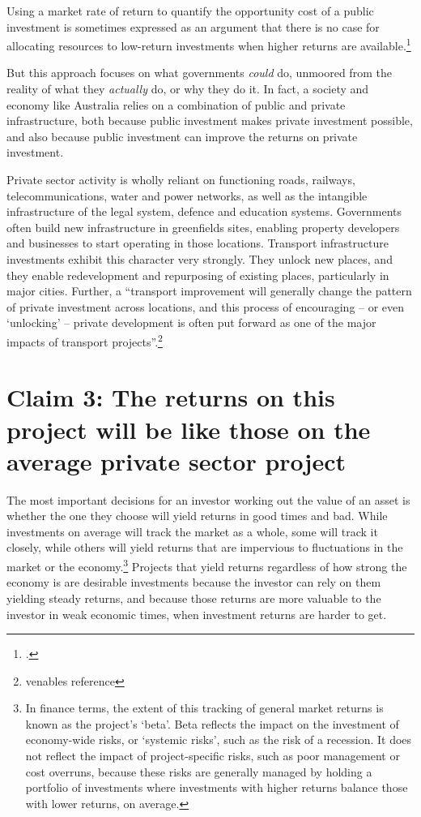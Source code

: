 Using a market rate of return to quantify the opportunity cost of a public investment is sometimes expressed as an argument that there is no case for allocating resources to low-return investments when higher returns are available.\footcite[][viii]{Harrison-Valuing-the-Future} 

But this approach focuses on what governments \emph{could} do, unmoored from the reality of what they \emph{actually} do, or why they do it. In fact, a society and economy like Australia relies on a combination of public and private infrastructure, both because public investment makes private investment possible, and also because public investment can improve the returns on private investment.

Private sector activity is wholly reliant on functioning roads, railways, telecommunications, water and power networks, as well as the intangible infrastructure of the legal system, defence and education systems. Governments often build new infrastructure in greenfields sites, enabling property developers and businesses to start operating in those locations. 
Transport infrastructure investments exhibit this character very strongly. They unlock new places, and they enable redevelopment and repurposing of existing places, particularly in major cities. Further, a “transport improvement will generally change the pattern of private investment across locations, and this process of encouraging – or even ‘unlocking’ – private development is often put forward as one of the major impacts of transport projects”.\footnote{venables reference} 

\section{Claim 3: The returns on this project will be like those on the average private sector project}

The most important decisions for an investor working out the value of an asset is whether the one they choose will yield returns in good times and bad. While investments on average will track the market as a whole, some will track it closely, while others will yield returns that are impervious to fluctuations in the market or the economy.\footnote{In finance terms, the extent of this tracking of general market returns is known as the project’s ‘beta’.  Beta reflects the impact on the investment of economy-wide risks, or ‘systemic risks’, such as the risk of a recession. It does not reflect the impact of project-specific risks, such as poor management or cost overruns, because these risks are generally managed by holding a portfolio of investments where investments with higher returns balance those with lower returns, on average.}
Projects that yield returns regardless of how strong the economy is are desirable investments because the investor can rely on them yielding steady returns, and because those returns are more valuable to the investor in weak economic times, when investment returns are harder to get. 

